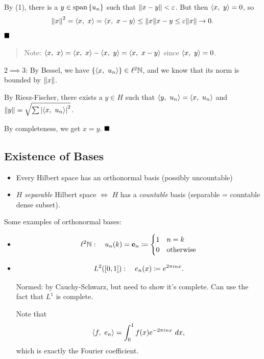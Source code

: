 By (1), there is a \(y\in \mathrm{span}\left\{{u_n}\right\}\) such that
\({\left\lVert {x - y} \right\rVert}< \varepsilon\). But then \({\left\langle {x},~{y} \right\rangle} = 0\), so
\begin{align*}
{\left\lVert {x} \right\rVert}^2 = {\left\langle {x},~{x} \right\rangle} = {\left\langle {x},~{x-y} \right\rangle} \leq {\left\lVert {x} \right\rVert}{x-y} \leq \varepsilon {\left\lVert {x} \right\rVert} \to 0
.\end{align*} \(\qed\)

\begin{quote}
Note: \({\left\langle {x},~{x} \right\rangle} = {\left\langle {x},~{x} \right\rangle} - {\left\langle {x},~{y} \right\rangle} = {\left\langle {x},~{x-y} \right\rangle}\)
since \({\left\langle {x},~{y} \right\rangle} = 0\).
\end{quote}

\(2 \implies 3\): By Bessel, we have
\(\left\{{{\left\langle {x},~{u_n} \right\rangle} }\right\} \in \ell^2 {\mathbb{N}}\), and we know that its norm
is bounded by \({\left\lVert {x} \right\rVert}\).

By Riesz-Fischer, there exists a \(y\in H\) such that
\({\left\langle {y},~{u_n} \right\rangle} = {\left\langle {x},~{u_n} \right\rangle}\) and
\({\left\lVert {y} \right\rVert} = \sqrt{ \sum {\left\lvert {{\left\langle {x},~{u_n} \right\rangle}} \right\rvert}^2 }\).

By completeness, we get \(x=y\). \(\qed\)

\hypertarget{existence-of-bases}{%
\subsection{Existence of Bases}\label{existence-of-bases}}

\begin{itemize}
\item
  Every Hilbert space has an orthonormal basis (possibly uncountable)
\item
  \(H\) \emph{separable} Hilbert space \(\iff\) \(H\) has a
  \emph{countable} basis (separable = countable dense subset).
\end{itemize}

Some examples of orthonormal bases:

\begin{itemize}
\item

  \begin{align*}
  \ell^2 {\mathbb{N}}: \quad u_n(k) = \mathbf{e}_n \coloneqq \begin{cases} 1 & n=k \\ 0 & \text{otherwise}\end{cases}
  \end{align*}
\item

  \begin{align*}
  L^2([0,1]):\quad e_n(x) \coloneqq e^{2\pi i n x}
  .\end{align*}

  Normed: by Cauchy-Schwarz, but need to show it's complete. Can use the
  fact that \(L^1\) is complete.

  Note that
  \begin{align*}
  {\left\langle {f},~{e_n} \right\rangle} = \int_0^1 f(x) e^{-2\pi i n x} ~dx
  ,\end{align*} which is exactly the Fourier coefficient.
\end{itemize}

